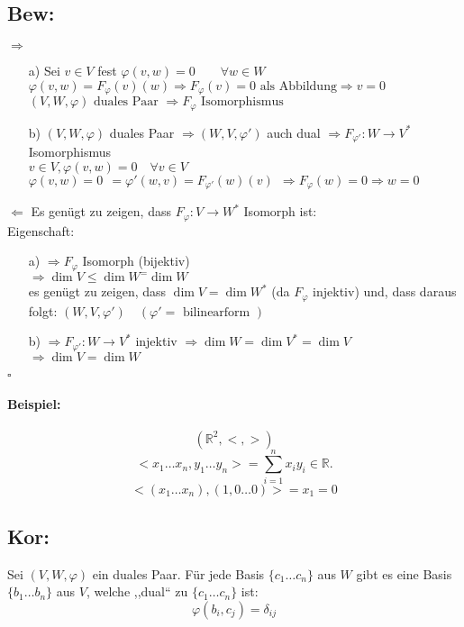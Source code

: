 \documentclass[titlepage,12pt,a4paper,ngerman]{report}
\newcommand{\tx}[1]{\textrm{#1}}
\begin{document}
\subsection{Bew:}
$\boxed{\Rightarrow}$
\begin{itemize}
	\item[a)] Sei $  v\in V $ fest $ \varphi(v,w) = 0 \qquad \forall w \in W $\\
	$ \varphi (v,w) = F _{\varphi} (v)(w) \Rightarrow F_{\varphi} (v) = 0  \tx{ als Abbildung} \Rightarrow v = 0$\\
	$ (V,W,\varphi) \tx{ duales Paar } \Rightarrow F_{\varphi} \tx{ Isomorphismus } $
	\item[b)] $ (V,W,\varphi) $ duales Paar $ \Rightarrow (W,V,\varphi') $ auch dual $ \Rightarrow F_{\varphi'}: W \to V^* $ Isomorphismus\\
	$ v\in V , \varphi(v,w) = 0 \quad \forall v \in V $\\
	$ \varphi(v,w) = 0 \ \ = \varphi'(w,v) = F_{\varphi'} (w)(v) \ \ \Rightarrow F_{\varphi}(w) = 0 \Rightarrow w = 0 $
\end{itemize}
$ \boxed{\Leftarrow} $ Es genügt zu zeigen, dass $ F_{\varphi}: V \to W^* $ Isomorph ist: \\
Eigenschaft:
\begin{itemize}
	\item[a)] $ \Rightarrow F_{\varphi} $ Isomorph (bijektiv)\\
	$ \Rightarrow \dim V \le \dim W^ = \dim W $\\
	es genügt zu zeigen, dass $ \dim V = \dim W^* $ (da $ F_{\varphi} $ injektiv)  und, dass daraus folgt: $ (W,V,\varphi') \quad  (\varphi' = \tx{ bilinearform } ) $
	\item[b)] $ \Rightarrow F_{\varphi'}: W \to V^* $ injektiv $ \Rightarrow \dim W = \dim V^* = \dim V $\\
	$ \Rightarrow \dim V = \dim W $
\end{itemize}
\begin{flushright}
	$ \square $
\end{flushright}

\paragraph{Beispiel:}
$$(\mathbb R^2, <, > )$$
$$<x_1 \dots x_n, y_1 \dots y_n> = \sum_{i=1}^n x_i y_i \in \mathbb R.$$
$$<(x_1 \dots x_n), (1, 0 \dots 0)> = x_1 = 0$$

\subsection{Kor:}
Sei $(V,W,\varphi)$ ein duales Paar. Für jede Basis $\{c_1 \dots c_n\}$ aus $W$ gibt es eine Basis $\{b_1 \dots b_n\}$ aus $V$, welche ,,dual`` zu $\{c_1 \dots c_n\}$ ist:
$$\varphi(b_i, c_j) = \delta_{ij}$$
\end{document}
